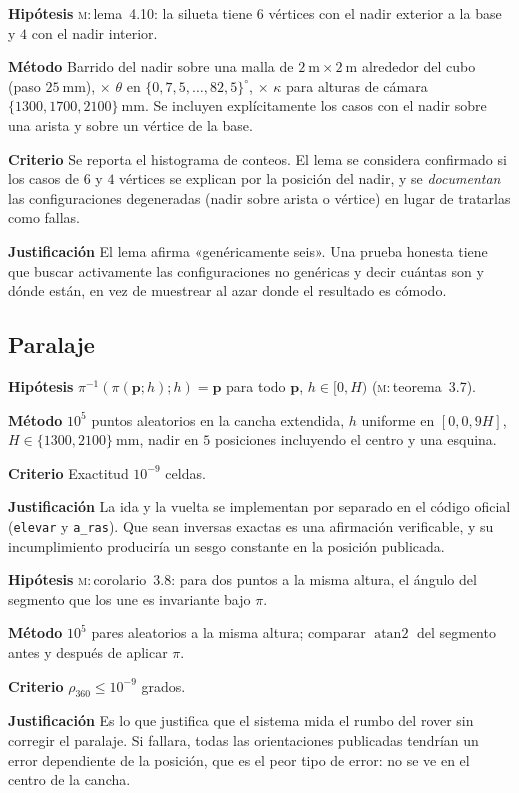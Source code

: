 \documentclass[11pt,a4paper]{article}
\newcommand{\pp}{\mathbf{p}}
\newcommand{\atantwo}{\operatorname{atan2}}
\newcommand{\grados}{^{\circ}}
\newenvironment{prueba}[2]{%
  \par\medskip\noindent
  \begin{tcolorbox}[enhanced,breakable,colback=white,colframe=black!45,
    boxrule=0.5pt,arc=1pt,left=6pt,right=6pt,top=4pt,bottom=4pt,
    title={\bfseries #1\quad\normalfont #2},
    colbacktitle=black!8,coltitle=black,fonttitle=\bfseries\small]
  \small
}{\end{tcolorbox}\par\medskip}
\newcommand{\campo}[1]{\par\smallskip\noindent\textbf{#1}\quad\ignorespaces}
\begin{document}
\begin{prueba}{N1.14}{Lema de silueta: conteo de vértices del casco convexo}
\campo{Hipótesis} \textsc{m}:\,lema~4.10: la silueta tiene $6$ vértices con el nadir
exterior a la base y $4$ con el nadir interior.
\campo{Método} Barrido del nadir sobre una malla de $2\ \mathrm{m}\times2\ \mathrm{m}$
alrededor del cubo (paso $25\ \mathrm{mm}$), $\times$ $\theta$ en
$\{0,7{,}5,\dots,82{,}5\}\grados$, $\times$ $\kappa$ para alturas de cámara
$\{1300, 1700, 2100\}\ \mathrm{mm}$. Se incluyen explícitamente los casos con el nadir
sobre una arista y sobre un vértice de la base.
\campo{Criterio} Se reporta el histograma de conteos. El lema se considera confirmado
si los casos de $6$ y $4$ vértices se explican por la posición del nadir, y se
\emph{documentan} las configuraciones degeneradas (nadir sobre arista o vértice) en
lugar de tratarlas como fallas.
\campo{Justificación} El lema afirma «genéricamente seis». Una prueba honesta tiene que
buscar activamente las configuraciones no genéricas y decir cuántas son y dónde están,
en vez de muestrear al azar donde el resultado es cómodo.
\end{prueba}

\subsection{Paralaje}

\begin{prueba}{N1.15}{Paralaje: la corrección es una involución exacta}
\campo{Hipótesis} $\pi^{-1}(\pi(\pp;h);h) = \pp$ para todo $\pp$, $h\in[0,H)$
(\textsc{m}:\,teorema~3.7).
\campo{Método} $10^5$ puntos aleatorios en la cancha extendida, $h$ uniforme en
$[0, 0{,}9H]$, $H \in \{1300, 2100\}\ \mathrm{mm}$, nadir en $5$ posiciones incluyendo
el centro y una esquina.
\campo{Criterio} Exactitud $10^{-9}$ celdas.
\campo{Justificación} La ida y la vuelta se implementan por separado en el código
oficial (\texttt{elevar} y \texttt{a\_ras}). Que sean inversas exactas es una
afirmación verificable, y su incumplimiento produciría un sesgo constante en la
posición publicada.
\end{prueba}

\begin{prueba}{N1.16}{Paralaje: invariancia de la dirección}
\campo{Hipótesis} \textsc{m}:\,corolario~3.8: para dos puntos a la misma altura, el ángulo
del segmento que los une es invariante bajo $\pi$.
\campo{Método} $10^5$ pares aleatorios a la misma altura; comparar
$\atantwo$ del segmento antes y después de aplicar $\pi$.
\campo{Criterio} $\rho_{360} \le 10^{-9}$ grados.
\campo{Justificación} Es lo que justifica que el sistema mida el rumbo del rover sin
corregir el paralaje. Si fallara, todas las orientaciones publicadas tendrían un error
dependiente de la posición, que es el peor tipo de error: no se ve en el centro de la
cancha.
\end{prueba}
\end{document}
